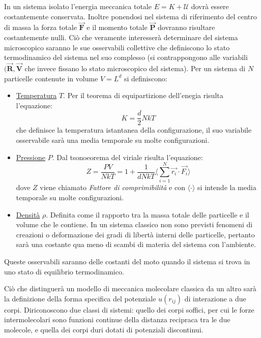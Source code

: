\documentclass[11pt]{article}
\theoremstyle{plain}
\theoremstyle{remark}
\begin{document}
\newline
In un sistema isolato l'energia meccanica totale $ E = K + \mathcal{U} $ dovrà essere costantemente conservata. Inoltre ponendosi nel sistema di riferimento del centro di massa la forza totale $\vec{\mathbf{F}}$ e il momento totale $\vec{\mathbf{P}}$ dovranno risultare costantemente nulli.
\medskip\newline
Ciò che veramente interesserà determinare del sistema microscopico saranno le sue osservabili collettive che definiscono lo stato termodinamico del sistema nel suo complesso (si contrappongono alle variabili $(\vec{\mathbf{R}},\vec{\mathbf{V}}$ che invece fissano lo stato microscopico del sistema). \newline
Per un sistema di $N$ particelle contenute in volume $V=L^d$ si definiscono:

\begin{itemize}
\item \underline{Temperatura} $T$. Per il teorema di equipartizione dell'enegia risulta l'equazione:
\begin{equation}\label{eq: temperatura}
K = \dfrac{d}{2}N k T
\end{equation}
che definisce la temperatura istantanea della configurazione, il suo variabile osservabile sarà una media temporale su molte configurazioni.

\item \underline{Pressione} $P$. Dal tsonoeorema del viriale risulta l'equazione:
\begin{equation}\label{eq: Pressione}
Z = \dfrac{P V}{N kT} = 1 + \dfrac{1}{d N kT} \Biggr\langle \sum_{i=1}^N \vec{r_i}\cdot\vec{F_i}\Biggr\rangle
\end{equation}
dove $Z$ viene chiamato \emph{Fattore di comprimibilità} e con $\langle \cdot \rangle$ si intende la media temporale su molte configurazioni.

\item \underline{Densità} $\rho$. Definita come il rapporto tra la massa totale delle particelle e il volume che le contiene. In un sistema classico non sono previsti fenomeni di creazioni o deformazione dei gradi di libertà interni delle particelle, pertanto sarà una costante qua meno di scambi di materia del sistema con l'ambiente.
\end{itemize}
Queste osservabili saranno delle costanti del moto quando il sistema si trova in uno stato di equilibrio termodinamico.

\medskip
Ciò che distinguerà un modello di meccanica molecolare classica da un altro sarà la definizione della forma specifica del potenziale $u(r_{ij})$ di interazione a due corpi. Diriconoscono due classi di sistemi: quello dei corpi soffici, per cui le forze intermolecolari sono funzioni continue della distanza recipraca tra le due molecole, e quella dei corpi duri dotati di potenziali discontinui.
\end{document}
